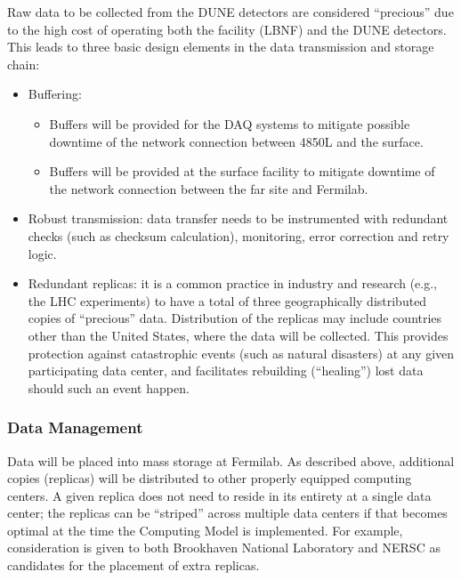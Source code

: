 Raw data to be collected from the DUNE detectors are considered
``precious'' due to the high cost of operating both the facility (LBNF) and the DUNE detectors. %
This leads to three
basic design elements in the data transmission and storage chain:
\begin{itemize}
\item Buffering:
\begin{itemize}
\item %
Buffers will be provided for the DAQ systems to
  mitigate possible downtime of the network connection between 4850L
  and the surface.
\item Buffers will be provided at the surface facility to mitigate
  downtime of the network connection between the far site and Fermilab.
\end{itemize}
\item Robust transmission: data transfer needs to be instrumented with
  redundant checks (such as checksum calculation), monitoring, error
  correction and retry logic.
\item Redundant replicas: it is a common practice in industry and
  research (e.g., the LHC experiments) to have a total of three geographically distributed copies
  of ``precious'' data.  %
  Distribution of the replicas may include countries
  other than the United States, where the data will be collected.
  This provides protection against catastrophic events (such as
  natural disasters) at any given participating data center, %
  and facilitates rebuilding (``healing'') lost data should
  such an event happen.
\end{itemize}


\subsubsection{Data Management}
\label{sec:detectors-sc-infrastructure-computing-model-data-mgt}

Data will be placed into mass storage at Fermilab. As
described above, additional copies (replicas) will be distributed to
other properly equipped computing centers. %
A given %
replica does not %
need to reside in its entirety at
a single data center; the replicas can be ``striped'' across multiple %
data centers if that becomes optimal at the time %
the Computing Model is implemented. For example, consideration is given to both
Brookhaven National Laboratory and NERSC as candidates for the
placement of extra replicas. 

